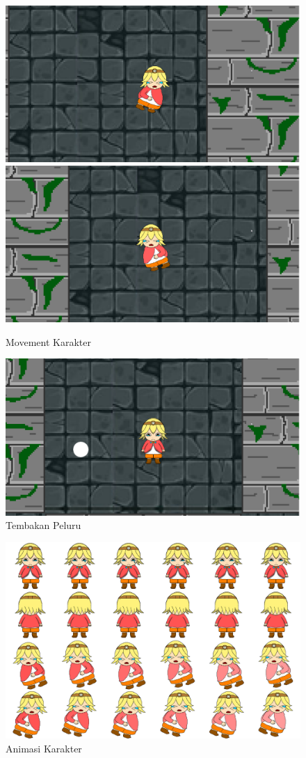 \documentclass[oneside, a4paper ,12pt]{book}
\begin{document}
\begin{figure} [h]
\centering
\includegraphics[width=10 cm]{Jalan Kanan.png}
\includegraphics[width=10 cm]{Jalan Kiri.png}
\caption{Movement Karakter}
\end{figure}
\begin{figure} [h]
\centering
\includegraphics[width=10 cm]{Tembak.png}
\caption{Tembakan Peluru}
\end{figure}
\begin{figure} [h]
\centering
\includegraphics[width=10 cm]{CharacterSprite.png}
\caption{Animasi Karakter}
\end{figure}
\end{document}
